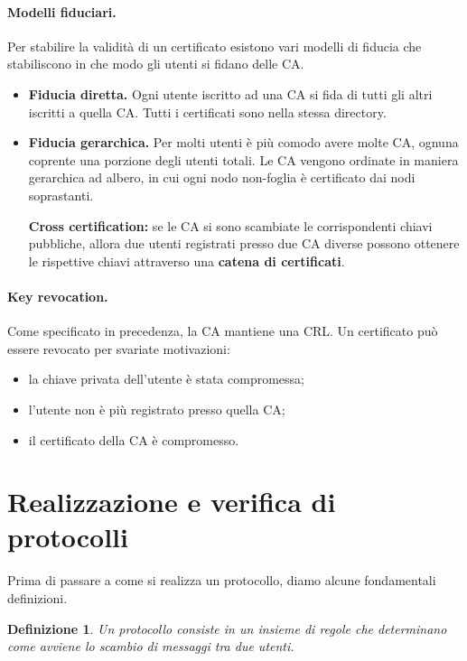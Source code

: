 \documentclass[a4paper, 10pt, twoside]{article}
\newtheorem{definit}{Definizione}[subsection]
\begin{document}
    \paragraph{Modelli fiduciari.}
    Per stabilire la validità di un certificato esistono vari modelli di fiducia che stabiliscono in che modo gli utenti si fidano delle CA.

    \begin{itemize}
        \item \textbf{Fiducia diretta.} Ogni utente iscritto ad una CA si fida di tutti gli altri iscritti a quella CA. Tutti i certificati sono nella stessa directory.
        
        \item \textbf{Fiducia gerarchica.} Per molti utenti è più comodo avere molte CA, ognuna coprente una porzione degli utenti totali. Le CA vengono ordinate in maniera gerarchica ad albero, in cui ogni nodo non-foglia è certificato dai nodi soprastanti.

        \textbf{Cross certification:} se le CA si sono scambiate le corrispondenti chiavi pubbliche, allora due utenti registrati presso due CA diverse possono ottenere le rispettive chiavi attraverso una \textbf{catena di certificati}.
    \end{itemize}

    
    \paragraph{Key revocation.}
    Come specificato in precedenza, la CA mantiene una CRL. Un certificato può essere revocato per svariate motivazioni: \begin{itemize}
        \item la chiave privata dell'utente è stata compromessa;
        \item l'utente non è più registrato presso quella CA;
        \item il certificato della CA è compromesso.
    \end{itemize}

    \section{Realizzazione e verifica di protocolli}
    Prima di passare a come si realizza un protocollo, diamo alcune fondamentali definizioni.
    \begin{definit}
        Un protocollo consiste in un insieme di regole che determinano come avviene lo scambio di messaggi tra due utenti.
    \end{definit}
\end{document}
